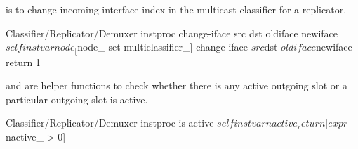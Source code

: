  is to change incoming interface index in the multicast classifier for a replicator.
\begin{program}
Classifier/Replicator/Demuxer instproc change-iface { src dst oldiface newiface} {
	$self instvar node_
        [$node_ set multiclassifier_] change-iface $src $dst $oldiface $newiface
        return 1
}
\end{program}


 and  are helper functions to check whether there is any active outgoing slot or a particular outgoing slot is active. 
\begin{program}
Classifier/Replicator/Demuxer instproc is-active {} {
	$self instvar nactive_
	return [expr $nactive_ > 0]
}
\end{program}

